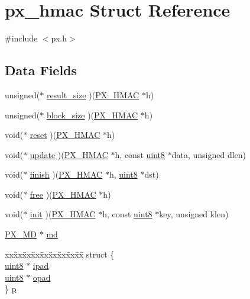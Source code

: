 \hypertarget{structpx__hmac}{\section{px\-\_\-hmac Struct Reference}
\label{structpx__hmac}
}


{\ttfamily \#include $<$px.\-h$>$}

\subsection*{Data Fields}
\begin{DoxyCompactItemize}
\item 
unsigned($\ast$ \hyperlink{structpx__hmac_a0cb0b623751c051d891c014c9205d580}{result\-\_\-size} )(\hyperlink{px_8h_a1b911a316581bee8ed722bd30f615d5c}{P\-X\-\_\-\-H\-M\-A\-C} $\ast$h)
\item 
unsigned($\ast$ \hyperlink{structpx__hmac_a633309528ca04e35bab8fc502ae96e99}{block\-\_\-size} )(\hyperlink{px_8h_a1b911a316581bee8ed722bd30f615d5c}{P\-X\-\_\-\-H\-M\-A\-C} $\ast$h)
\item 
void($\ast$ \hyperlink{structpx__hmac_a64ffc8c49352689a88434c0ebc037714}{reset} )(\hyperlink{px_8h_a1b911a316581bee8ed722bd30f615d5c}{P\-X\-\_\-\-H\-M\-A\-C} $\ast$h)
\item 
void($\ast$ \hyperlink{structpx__hmac_a0bb46e1f461f7d0300e0d8d8c9c2f306}{update} )(\hyperlink{px_8h_a1b911a316581bee8ed722bd30f615d5c}{P\-X\-\_\-\-H\-M\-A\-C} $\ast$h, const \hyperlink{c_8h_adde6aaee8457bee49c2a92621fe22b79}{uint8} $\ast$data, unsigned dlen)
\item 
void($\ast$ \hyperlink{structpx__hmac_a5891604df1dcbc091bca70a4e6b041d8}{finish} )(\hyperlink{px_8h_a1b911a316581bee8ed722bd30f615d5c}{P\-X\-\_\-\-H\-M\-A\-C} $\ast$h, \hyperlink{c_8h_adde6aaee8457bee49c2a92621fe22b79}{uint8} $\ast$dst)
\item 
void($\ast$ \hyperlink{structpx__hmac_aaec97ad622d5ef2ac7ab6b166bddc63a}{free} )(\hyperlink{px_8h_a1b911a316581bee8ed722bd30f615d5c}{P\-X\-\_\-\-H\-M\-A\-C} $\ast$h)
\item 
void($\ast$ \hyperlink{structpx__hmac_a67b9614118aa8555a07c89c59c5c75ac}{init} )(\hyperlink{px_8h_a1b911a316581bee8ed722bd30f615d5c}{P\-X\-\_\-\-H\-M\-A\-C} $\ast$h, const \hyperlink{c_8h_adde6aaee8457bee49c2a92621fe22b79}{uint8} $\ast$key, unsigned klen)
\item 
\hyperlink{px_8h_a21fa22732371ffb7737caceba5e087dd}{P\-X\-\_\-\-M\-D} $\ast$ \hyperlink{structpx__hmac_a03c811c1ae1050bb260e48c10fa87cb0}{md}
\item 
\begin{tabbing}
xx\=xx\=xx\=xx\=xx\=xx\=xx\=xx\=xx\=\kill
struct \{\\
\>\hyperlink{c_8h_adde6aaee8457bee49c2a92621fe22b79}{uint8} $\ast$ \hyperlink{structpx__hmac_a234c1fdafd4a075f20669c23a1ccf025}{ipad}\\
\>\hyperlink{c_8h_adde6aaee8457bee49c2a92621fe22b79}{uint8} $\ast$ \hyperlink{structpx__hmac_aa16d837ed7c5cd1d54b11bb73a1b9ed6}{opad}\\
\} \hyperlink{structpx__hmac_a9dc542fa7e54271064310f5d6780bfe7}{p}\\


\end{tabbing}
\end{DoxyCompactItemize}
